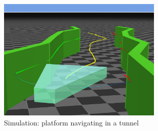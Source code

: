 \begin{columns}[T,onlytextwidth]
\begin{column}[T]{0.4\textwidth}
        \vskip-1cm
        \begin{figure}[H]
            \centering
            \captionsetup{justification=centering}
            \includegraphics[width=0.7\textwidth]{figures/platform-in-tunnel}
            \caption{Simulation: platform navigating in a tunnel}
        \end{figure}
    \end{column}
\end{columns}